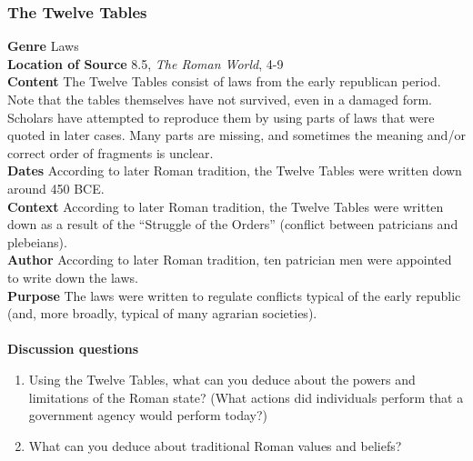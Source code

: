 \documentclass{article}
\begin{document}
\subsubsection*{The Twelve Tables}
\textbf{Genre}
Laws \\
\textbf{Location of Source}
8.5, \textit{The Roman World}, 4-9 \\
\textbf{Content}
The Twelve Tables consist of laws from the early republican period.  Note that the tables themselves have not survived, even in a damaged form.  Scholars have attempted to reproduce them by using parts of laws that were quoted in later cases.  Many parts are missing, and sometimes the meaning and/or correct order of fragments is unclear. \\
\textbf{Dates}
According to later Roman tradition, the Twelve Tables were written down around 450 BCE. \\
\textbf{Context}
According to later Roman tradition, the Twelve Tables were written down as a result of the “Struggle of the Orders” (conflict between patricians and plebeians). \\
\textbf{Author}
According to later Roman tradition, ten patrician men were appointed to write down the laws. \\
\textbf{Purpose}
The laws were written to regulate conflicts typical of the early republic (and, more broadly, typical of many agrarian societies). \\
\\
\textbf{Discussion questions}
\begin{enumerate}
  \item Using the Twelve Tables, what can you deduce about the powers and limitations of the Roman state?  (What actions did individuals perform that a government agency would perform today?)
  \item What can you deduce about traditional Roman values and beliefs?
\end{enumerate}
\end{document}
